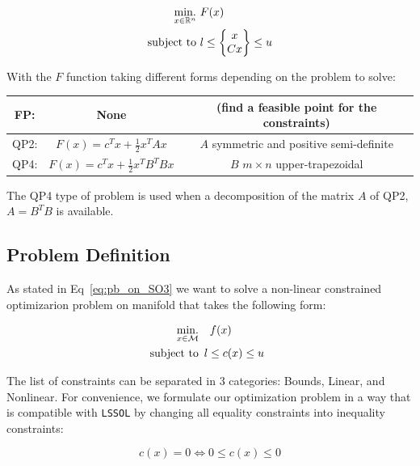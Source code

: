\begin{align}
  \operatorname*{min.}_{x\in \mathbb{R}^n}\ &{F(x)}\\
  \text{subject to}\  & l\leq \begin{Bmatrix}
    x\\
    Cx
  \end{Bmatrix}
  \leq u
\end{align}

With the $F$ function taking different forms depending on the problem to solve:
\begin{table} [H]
\centering
\begin{tabular}{ccc}
  \toprule
  FP:\@ & None & (find a feasible point for the constraints)\\
  \midrule
  QP2: & $F(x)=c^T x+\frac{1}{2} x^T A x$ & $A$ symmetric and positive semi-definite \\
  \midrule
  QP4: & $F(x)=c^T x+\frac{1}{2} x^T B^T B x$ & $B$ $m\times n$ upper-trapezoidal \\
  \bottomrule
\end{tabular}
\end{table}

The QP4 type of problem is used when a decomposition of the matrix $A$ of QP2, $A=B^T B$ is available.

\subsection{Problem Definition}
\label{sub:problem_definition}

As stated in Eq~\ref{eq:pb_on_SO3} we want to solve a non-linear constrained optimizarion problem on manifold that takes the following form:

\begin{align}
  \operatorname*{min.}_{x \in \mathcal{M}} & \quad f(x)\\
  \text{subject to}&
  \begin{array}{lr}
    l \leq c(x) \leq u \nonumber
  \end{array}
\end{align}

The list of constraints can be separated in 3 categories: Bounds, Linear, and Nonlinear.
For convenience, we formulate our optimization problem in a way that is compatible with {\tt LSSOL} by changing all equality constraints into inequality constraints:

\begin{equation}
  c(x) = 0 \Leftrightarrow 0 \leq c(x) \leq 0
\end{equation}

